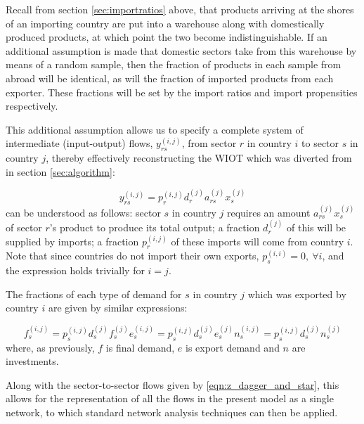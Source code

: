 \documentclass[a4paper]{article}
\begin{document}
Recall from section \ref{sec:importratios} above, that products arriving at the shores of an importing country are put into a warehouse along with domestically produced products, at which point the two become indistinguishable.
If an additional assumption is made that domestic sectors take from this warehouse by means of a random sample, then the fraction of products in each sample from abroad will be identical, as will the fraction of imported products from each exporter.
These fractions will be set by the import ratios and import propensities respectively.

This additional assumption allows us to specify a complete system of intermediate (input-output) flows, $y_{rs}^{(i,j)}$, from sector $r$ in country $i$ to sector $s$ in country $j$, thereby effectively reconstructing the WIOT which was diverted from in section \ref{sec:algorithm}:

\begin{equation}\label{eqn:y_rsij}
y_{rs}^{(i,j)} = p_{r}^{(i,j)} d_{r}^{(j)} a_{rs}^{(j)} x_{s}^{(j)}
\end{equation}
 can be understood as follows:
sector $s$ in country $j$ requires an amount $a_{rs}^{(j)} x_{s}^{(j)}$ of sector $r$'s product to produce its total output;
a fraction $d_{r}^{(j)}$ of this will be supplied by imports;
a fraction $p_{r}^{(i,j)}$ of these imports will come from country $i$. Note that since countries do not import their own exports, $p_s^{(i,i)}=0,\ \forall i$, and the expression holds trivially for $i=j$.

The fractions of each type of demand for $s$ in country $j$ which was exported by country $i$ are given by similar expressions:

\begin{subequations}
\begin{equation}\label{eqn:f_sij}
f_{s}^{(i,j)} = p_{s}^{(i,j)} d_{s}^{(j)} f_{s}^{(j)}
\end{equation}
\begin{equation}\label{eqn:e_sij}
e_{s}^{(i,j)} = p_{s}^{(i,j)} d_{s}^{(j)} e_{s}^{(j)}
\end{equation}
\begin{equation}\label{eqn:n_sij}
n_{s}^{(i,j)} = p_{s}^{(i,j)} d_{s}^{(j)} n_{s}^{(j)}
\end{equation}
\end{subequations}
where, as previously, $f$ is final demand, $e$ is export demand and $n$ are investments.

Along with the sector-to-sector flows given by \cref{eqn:z_dagger_and_star}, this allows for the representation of all the flows in the present model as a single network, to which standard network analysis techniques can then be applied.
\end{document}
